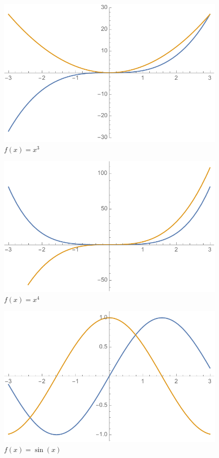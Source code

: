 \documentclass[letterpaper, landscape]{exam}
\begin{document}
  \begin{figure}[H]
    \centering
    \includegraphics[scale = 0.5]{example03.pdf}
    \caption{$f(x) = x^3$}
    \label{fig:example03}
  \end{figure}

  \begin{figure}[H]
    \centering
    \includegraphics[scale = 0.5]{example04.pdf}
    \caption{$f(x) = x^4$}
    \label{fig:example04}
  \end{figure}

  \begin{figure}[H]
    \centering
    \includegraphics[scale = 0.5]{example05.pdf}
    \caption{$f(x) = \sin(x)$}
    \label{fig:example05}
  \end{figure}
\end{document}
